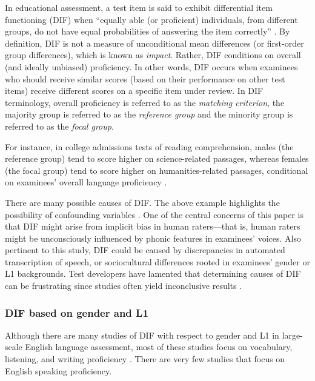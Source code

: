 \documentclass [PhD] {uclathes}
\begin{document}
In educational assessment, a test item is said to exhibit differential item functioning (DIF) when “equally able (or proficient) individuals, from different groups, do not have equal probabilities of answering the item correctly” \citep[][p. 4]{angoff1993}. By definition, DIF is not a measure of unconditional mean differences (or first-order group differences), which is known as \emph{impact}. Rather, DIF conditions on overall (and ideally unbiased) proficiency. In other words, DIF occurs when examinees who should receive similar scores (based on their performance on other test items) receive different scores on a specific item under review. In DIF terminology, overall proficiency is referred to as the \emph{matching criterion}, the majority group is referred to as the \emph{reference group} and the minority group is referred to as the \emph{focal group}.

For instance, in college admissions tests of reading comprehension, males (the reference group) tend to score higher on science-related passages, whereas females (the focal group) tend to score higher on humanities-related passages, conditional on examinees’ overall language proficiency \citep[i.e., the matching criterion;][]{steedle2023}. 

There are many possible causes of DIF. The above example highlights the possibility of confounding variables \citep[e.g. males tend to major in STEM at a higher rate;][]{sloane2021college}. One of the central concerns of this paper is that DIF might arise from implicit bias in human raters—that is, human raters might be unconsciously influenced by phonic features in examinees’ voices. Also pertinent to this study, DIF could be caused by discrepancies in automated transcription of speech, or sociocultural differences rooted in examinees’ gender or L1 backgrounds. Test developers have lamented that determining causes of DIF can be frustrating since studies often yield inconclusive results \citep{zumbo2007}. 

\subsubsection{DIF based on gender and L1}

Although there are many studies of DIF with respect to gender and L1 in large-scale English language assessment, most of these studies focus on vocabulary, listening, and writing proficiency \citep{kunnan2017evaluating}. There are very few studies that focus on English speaking proficiency. 
\end{document}
